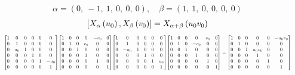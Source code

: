 \documentclass[11pt]{article}
\theoremstyle{definition}
\begin{document}
\[
\alpha = \left( 0, \  -1, \  1, \  0, \  0, \  0\right), \quad \beta = \left( 1, \  1, \  0, \  0, \  0, \  0\right)
\]
\[
\scaletoalign{\textwidth}{\left[ X_{\alpha}\left(u_{0}\right), X_{\beta}\left(v_{0}\right) \right] = X_{\alpha + \beta}\left(u_{0} v_{0}\right)}
\]
\[
\scaletoalign{\textwidth}{{\left[\begin{matrix}1 & 0 & 0 & 0 & 0 & 0\\0 & 1 & 0 & 0 & 0 & 0\\0 & u_{0} & 1 & 0 & 0 & 0\\0 & 0 & 0 & 1 & 0 & 0\\0 & 0 & 0 & 0 & 1 & - u_{0}\\0 & 0 & 0 & 0 & 0 & 1\end{matrix}\right]} {\left[\begin{matrix}1 & 0 & 0 & 0 & - v_{0} & 0\\0 & 1 & 0 & v_{0} & 0 & 0\\0 & 0 & 1 & 0 & 0 & 0\\0 & 0 & 0 & 1 & 0 & 0\\0 & 0 & 0 & 0 & 1 & 0\\0 & 0 & 0 & 0 & 0 & 1\end{matrix}\right]} {\left[\begin{matrix}1 & 0 & 0 & 0 & 0 & 0\\0 & 1 & 0 & 0 & 0 & 0\\0 & - u_{0} & 1 & 0 & 0 & 0\\0 & 0 & 0 & 1 & 0 & 0\\0 & 0 & 0 & 0 & 1 & u_{0}\\0 & 0 & 0 & 0 & 0 & 1\end{matrix}\right]} {\left[\begin{matrix}1 & 0 & 0 & 0 & v_{0} & 0\\0 & 1 & 0 & - v_{0} & 0 & 0\\0 & 0 & 1 & 0 & 0 & 0\\0 & 0 & 0 & 1 & 0 & 0\\0 & 0 & 0 & 0 & 1 & 0\\0 & 0 & 0 & 0 & 0 & 1\end{matrix}\right]} = {\left[\begin{matrix}1 & 0 & 0 & 0 & 0 & - u_{0} v_{0}\\0 & 1 & 0 & 0 & 0 & 0\\0 & 0 & 1 & u_{0} v_{0} & 0 & 0\\0 & 0 & 0 & 1 & 0 & 0\\0 & 0 & 0 & 0 & 1 & 0\\0 & 0 & 0 & 0 & 0 & 1\end{matrix}\right]}}
\]
\end{document}
